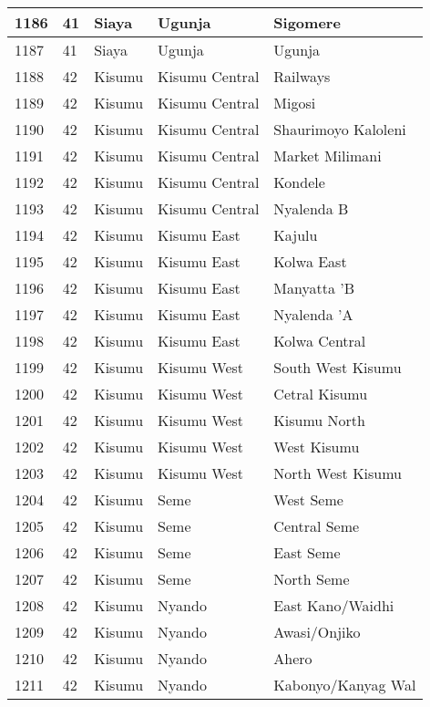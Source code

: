 \begin{table}[!ht]
\begin{tabular}{|l|l|l|l|l|}
        1186 & 41 & Siaya & Ugunja & Sigomere \\ \hline
        1187 & 41 & Siaya & Ugunja & Ugunja \\ \hline
        1188 & 42 & Kisumu & Kisumu Central & Railways \\ \hline
        1189 & 42 & Kisumu & Kisumu Central & Migosi \\ \hline
        1190 & 42 & Kisumu & Kisumu Central & Shaurimoyo Kaloleni \\ \hline
        1191 & 42 & Kisumu & Kisumu Central & Market Milimani \\ \hline
        1192 & 42 & Kisumu & Kisumu Central & Kondele \\ \hline
        1193 & 42 & Kisumu & Kisumu Central & Nyalenda B \\ \hline
        1194 & 42 & Kisumu & Kisumu East & Kajulu \\ \hline
        1195 & 42 & Kisumu & Kisumu East & Kolwa East \\ \hline
        1196 & 42 & Kisumu & Kisumu East & Manyatta ’B \\ \hline
        1197 & 42 & Kisumu & Kisumu East & Nyalenda ’A \\ \hline
        1198 & 42 & Kisumu & Kisumu East & Kolwa Central \\ \hline
        1199 & 42 & Kisumu & Kisumu West & South West Kisumu \\ \hline
        1200 & 42 & Kisumu & Kisumu West & Cetral Kisumu \\ \hline
        1201 & 42 & Kisumu & Kisumu West & Kisumu North \\ \hline
        1202 & 42 & Kisumu & Kisumu West & West Kisumu \\ \hline
        1203 & 42 & Kisumu & Kisumu West & North West Kisumu \\ \hline
        1204 & 42 & Kisumu & Seme & West Seme \\ \hline
        1205 & 42 & Kisumu & Seme & Central Seme \\ \hline
        1206 & 42 & Kisumu & Seme & East Seme \\ \hline
        1207 & 42 & Kisumu & Seme & North Seme \\ \hline
        1208 & 42 & Kisumu & Nyando & East Kano/Waidhi \\ \hline
        1209 & 42 & Kisumu & Nyando & Awasi/Onjiko \\ \hline
        1210 & 42 & Kisumu & Nyando & Ahero \\ \hline
        1211 & 42 & Kisumu & Nyando & Kabonyo/Kanyag Wal \\ \hline

\end{tabular}
\end{table}
